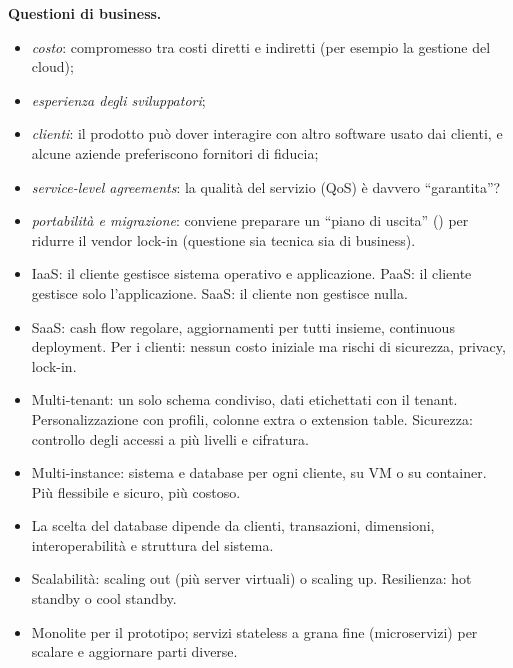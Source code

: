 \textbf{Questioni di business.}
\begin{itemize}
  \item \emph{costo}: compromesso tra costi diretti e indiretti (per esempio la gestione del cloud);
  \item \emph{esperienza degli sviluppatori};
  \item \emph{clienti}: il prodotto può dover interagire con altro software usato dai clienti, e alcune
    aziende preferiscono fornitori di fiducia;
  \item \emph{service-level agreements}: la qualità del servizio (QoS) è davvero ``garantita''?
  \item \emph{portabilità e migrazione}: conviene preparare un ``piano di uscita'' () per ridurre il
    vendor lock-in (questione sia tecnica sia di business).
\end{itemize}

\begin{puntichiave}
\begin{itemize}
  \item IaaS: il cliente gestisce sistema operativo e applicazione. PaaS: il cliente gestisce solo l'applicazione.
    SaaS: il cliente non gestisce nulla.
  \item SaaS: cash flow regolare, aggiornamenti per tutti insieme, continuous deployment. Per i clienti: nessun costo
    iniziale ma rischi di sicurezza, privacy, lock-in.
  \item Multi-tenant: un solo schema condiviso, dati etichettati con il tenant. Personalizzazione con profili, colonne
    extra o extension table. Sicurezza: controllo degli accessi a più livelli e cifratura.
  \item Multi-instance: sistema e database per ogni cliente, su VM o su container. Più flessibile e sicuro, più costoso.
  \item La scelta del database dipende da clienti, transazioni, dimensioni, interoperabilità e struttura del sistema.
  \item Scalabilità: scaling out (più server virtuali) o scaling up. Resilienza: hot standby o cool standby.
  \item Monolite per il prototipo; servizi stateless a grana fine (microservizi) per scalare e aggiornare parti
    diverse.
\end{itemize}
\end{puntichiave}

